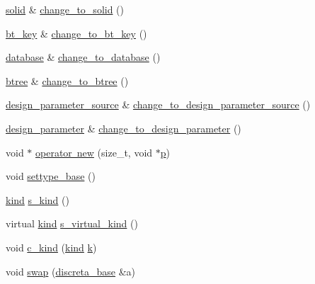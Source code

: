 \begin{DoxyCompactItemize}
\item 
\mbox{\hyperlink{classsolid}{solid}} \& \mbox{\hyperlink{classdiscreta__base_adb0b11a85434f969b3895cb46b67e8c2}{change\+\_\+to\+\_\+solid}} ()
\item 
\mbox{\hyperlink{classbt__key}{bt\+\_\+key}} \& \mbox{\hyperlink{classdiscreta__base_af08930510236fe08941bb5c1e4768fe9}{change\+\_\+to\+\_\+bt\+\_\+key}} ()
\item 
\mbox{\hyperlink{classdatabase}{database}} \& \mbox{\hyperlink{classdiscreta__base_a9187fb1e0526e3d327b78bb19475ae40}{change\+\_\+to\+\_\+database}} ()
\item 
\mbox{\hyperlink{classbtree}{btree}} \& \mbox{\hyperlink{classdiscreta__base_a75c8608cf54191c17ee48817cc4dda17}{change\+\_\+to\+\_\+btree}} ()
\item 
\mbox{\hyperlink{classdesign__parameter__source}{design\+\_\+parameter\+\_\+source}} \& \mbox{\hyperlink{classdiscreta__base_adef7252719a3b1b5261d6bc6c44dbda4}{change\+\_\+to\+\_\+design\+\_\+parameter\+\_\+source}} ()
\item 
\mbox{\hyperlink{classdesign__parameter}{design\+\_\+parameter}} \& \mbox{\hyperlink{classdiscreta__base_ab207ed39acee5f447708dc9fcfd29e0a}{change\+\_\+to\+\_\+design\+\_\+parameter}} ()
\item 
void $\ast$ \mbox{\hyperlink{classdiscreta__base_aa42f42d6b940b80fbf451b10620e99ac}{operator new}} (size\+\_\+t, void $\ast$\mbox{\hyperlink{alphabet2_8_c_a533391314665d6bf1b5575e9a9cd8552}{p}})
\item 
void \mbox{\hyperlink{classdiscreta__base_a4f42899a89447d1c3993ea07c38f8ad4}{settype\+\_\+base}} ()
\item 
\mbox{\hyperlink{discreta_8h_aaf25ee7e2306d78c74ec7bc48f092e81}{kind}} \mbox{\hyperlink{classdiscreta__base_a8a830025c74adbbc3362418a7c2ba157}{s\+\_\+kind}} ()
\item 
virtual \mbox{\hyperlink{discreta_8h_aaf25ee7e2306d78c74ec7bc48f092e81}{kind}} \mbox{\hyperlink{classdiscreta__base_a52778a6d6943a468be083d0785d418fb}{s\+\_\+virtual\+\_\+kind}} ()
\item 
void \mbox{\hyperlink{classdiscreta__base_adc2ff61589c2d083688e7a43f333cb62}{c\+\_\+kind}} (\mbox{\hyperlink{discreta_8h_aaf25ee7e2306d78c74ec7bc48f092e81}{kind}} \mbox{\hyperlink{classdiscreta__base_a6f7a0f7bdd115b9e4dde358cfa7ebf81}{k}})
\item 
void \mbox{\hyperlink{classdiscreta__base_a2e8acbb9d3476675dac5b6a583b0293e}{swap}} (\mbox{\hyperlink{classdiscreta__base}{discreta\+\_\+base}} \&a)
\item 

\end{DoxyCompactItemize}
